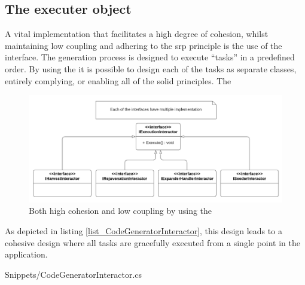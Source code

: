 \subsection{The executer object} \label{subsec_IExecutionInteractorObject}

A vital implementation that facilitates a high degree of cohesion, whilst maintaining
low coupling and adhering to the \gls{srp} principle is the use of the
 interface. The generation process is designed to
execute \enquote{tasks} in a predefined order. By using the
 it is possible to design each of the tasks as
separate classes, entirely complying, or enabling all of the \gls{solid} principles. The 

\begin{figure}[H]
    \centering
    \includegraphics[width=1\textwidth]{Figures/class_diagram_iexecutioninteractor.pdf}
    \caption[Plugin Archticture]{Both high cohesion and low coupling by using the }
    \label{fig_iexecutioninteractor}
  \end{figure}


As depicted in listing \ref{list_CodeGeneratorInteractor}, this design leads to a cohesive
design where all tasks are gracefully executed from a single point in the application.
 
  {Snippets/CodeGeneratorInteractor.cs}